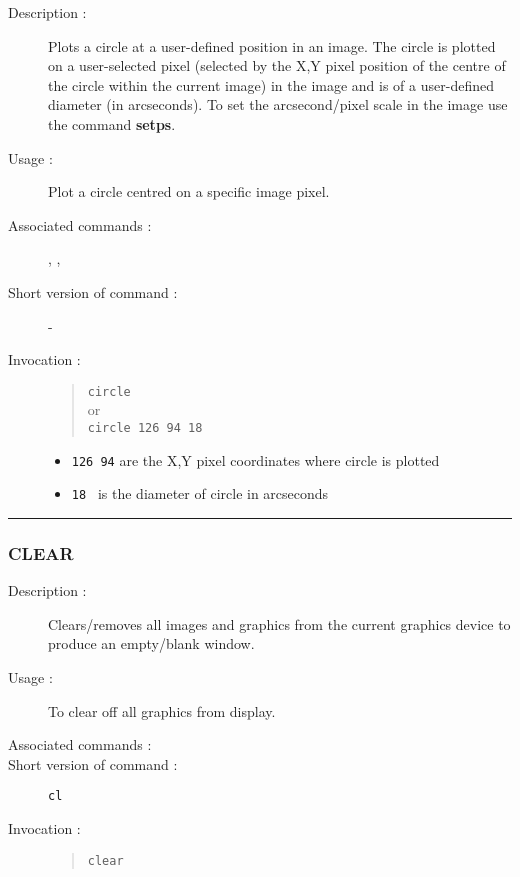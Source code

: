 \begin{description}

\item[Description :] Plots a circle at a user-defined position in an
image.  The circle is plotted on a user-selected pixel (selected by the
X,Y pixel position of the centre of the circle within the current
image) in the image and is of a user-defined diameter (in arcseconds).
To set the arcsecond/pixel scale in the image use the command {\bf setps}.

\item[Usage :] Plot a circle centred on a specific image pixel.
\item[Associated commands :] {\tt {}},
{\tt {}}, {\tt {}}
\item[Short version of command :] -
\item[Invocation :]

\begin{quote}{\tt  circle }\\
or \\
{\tt circle 126 94 18 }
\end{quote}

\begin{itemize}

\item {\tt 126 94} are the X,Y pixel coordinates where circle is plotted
\item {\tt 18 } is the diameter of circle in arcseconds
\end{itemize}

\end{description}

\hrule
\subsubsection*{\label{CLEAR}CLEAR}

\begin{description}

\item[Description :] Clears/removes all images and graphics from the
current graphics device to produce an empty/blank window.

\item[Usage :] To clear off all graphics from display.
\item[Associated commands :] {\tt {}}
\item[Short version of command :] {\tt cl}
\item[Invocation :]

\begin{quote}{\tt  clear }\end{quote}

\end{description}


